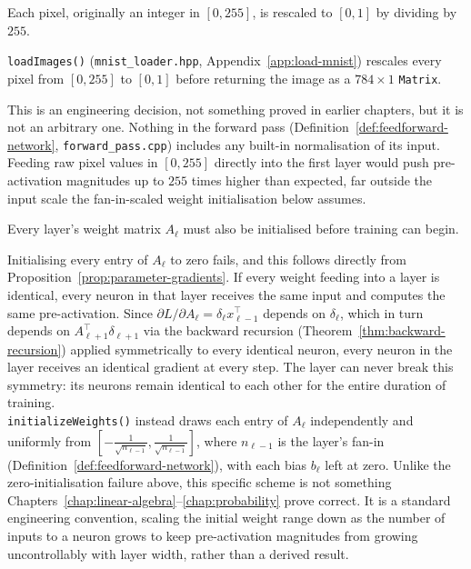 	Each pixel, originally an integer in $[0,255]$, is rescaled to $[0,1]$ by dividing by $255$.
	
	\begin{compremark}
		\texttt{loadImages()} (\texttt{mnist\_loader.hpp}, Appendix~\ref{app:load-mnist}) rescales every pixel from $[0,255]$ to $[0,1]$ before returning the image as a $784\times1$ \texttt{Matrix}.
		
		This is an engineering decision, not something proved in earlier chapters, but it is not an arbitrary one. Nothing in the forward pass (Definition~\ref{def:feedforward-network}, \texttt{forward\_pass.cpp}) includes any built-in normalisation of its input. Feeding raw pixel values in $[0,255]$ directly into the first layer would push pre-activation magnitudes up to $255$ times higher than expected, far outside the input scale the fan-in-scaled weight initialisation below assumes.
	\end{compremark}
	
	Every layer's weight matrix $A_\ell$ must also be initialised before training can begin.
	
	Initialising every entry of $A_\ell$ to zero fails, and this follows directly from Proposition~\ref{prop:parameter-gradients}. If every weight feeding into a layer is identical, every neuron in that layer receives the same input and computes the same pre-activation. Since $\partial L/\partial A_\ell=\delta_\ell x_{\ell-1}^\top$ depends on $\delta_\ell$, which in turn depends on $A_{\ell+1}^\top\delta_{\ell+1}$ via the backward recursion (Theorem~\ref{thm:backward-recursion}) applied symmetrically to every identical neuron, every neuron in the layer receives an identical gradient at every step. The layer can never break this symmetry: its neurons remain identical to each other for the entire duration of training. \\
	
	\texttt{initializeWeights()} instead draws each entry of $A_\ell$ independently and uniformly from $\left[-\frac{1}{\sqrt{n_{\ell-1}}},\frac{1}{\sqrt{n_{\ell-1}}}\right]$, where $n_{\ell-1}$ is the layer's fan-in (Definition~\ref{def:feedforward-network}), with each bias $b_\ell$ left at zero. Unlike the zero-initialisation failure above, this specific scheme is not something Chapters~\ref{chap:linear-algebra}--\ref{chap:probability} prove correct. It is a standard engineering convention, scaling the initial weight range down as the number of inputs to a neuron grows to keep pre-activation magnitudes from growing uncontrollably with layer width, rather than a derived result.

